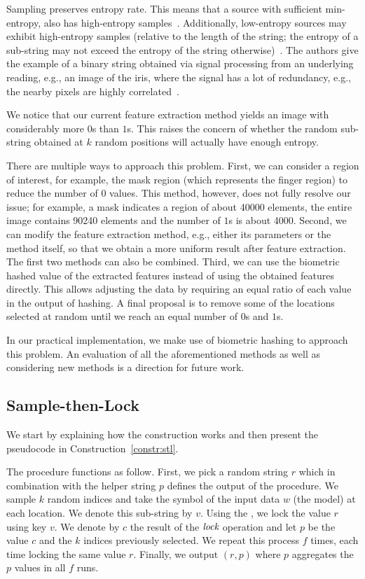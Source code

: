 Sampling preserves entropy rate. This means that a source with sufficient min-entropy, also has high-entropy samples~\cite{reusablefe}.
Additionally, low-entropy sources may exhibit high-entropy samples (relative to the length of the string; the entropy of a sub-string may not exceed the entropy of the string otherwise)~\cite{reusablefe}.
The authors give the example of a binary string obtained via signal processing from an underlying reading, e.g., an image of the iris, where the signal has a lot of redundancy, e.g., the nearby pixels are highly correlated~\cite{reusablefe}.

We notice that our current feature extraction method yields an image with considerably more $0$s than $1$s. This raises the concern of whether the random sub-string obtained at $k$ random positions will actually have enough entropy.

There are multiple ways to approach this problem.
First, we can consider a region of interest, for example, the mask region (which represents the finger region) to reduce the number of $0$ values. This method, however, does not fully resolve our issue; for example, a mask indicates a region of about 40000 elements, the entire image contains 90240 elements and the number of $1$s is about 4000. Second, we can modify the feature extraction method, e.g., either its parameters or the method itself, so that we obtain a more uniform result after feature extraction. The first two methods can also be combined. 
Third, we can use the biometric hashed value of the extracted features instead of using the obtained features directly. This allows adjusting the data by requiring an equal ratio of each value in the output of hashing. 
A final proposal is to remove some of the locations selected at random until we reach an equal number of $0$s and $1$s.

In our practical implementation, we make use of biometric hashing to approach this problem. An evaluation of all the aforementioned methods as well as considering new methods is a direction for future work. 

\subsection{Sample-then-Lock}

We start by explaining how the construction works and then present the pseudocode
in Construction~\ref{constr:stl}. 

The \gen procedure functions as follow.
First, we pick a random string $r$ which in combination with the helper string $p$ defines the output of the procedure. 
We sample $k$ random indices and take the symbol of the input data $w$ (the model) at each location. We denote this sub-string by $v$. 
Using the \dl, we lock the value $r$ using key $v$. We denote by $c$ the result of the $\textit{lock}$ operation and let $p$ be the value $c$ and the $k$ indices previously selected. We repeat this process $f$ times, each time locking the same value $r$. Finally, we output $(r,p)$ where $p$ aggregates the $p$ values in all $f$ runs.

